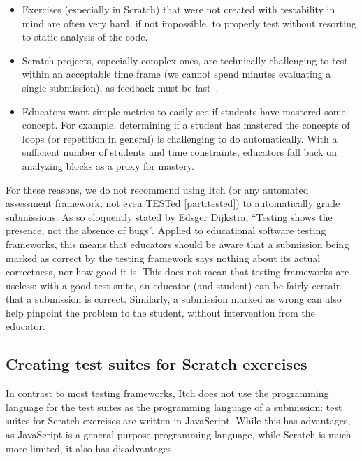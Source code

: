 \documentclass[../main]{subfiles}
\begin{document}
\begin{itemize}
    \item Exercises (especially in Scratch) that were not created with testability in mind are often very hard, if not impossible, to properly test without resorting to static analysis of the code.
    \item Scratch projects, especially complex ones, are technically challenging to test within an acceptable time frame (we cannot spend minutes evaluating a single submission), as feedback must be fast~\autocite{sarsaSpeedingAutomatedAssessment2022}.
    \item Educators want simple metrics to easily see if students have mastered some concept.
          For example, determining if a student has mastered the concepts of loops (or repetition in general) is challenging to do automatically.
          With a sufficient number of students and time constraints, educators fall back on analyzing blocks as a proxy for mastery.
\end{itemize}

For these reasons, we do not recommend using Itch (or any automated assessment framework, not even TESTed \cref{part:tested}) to automatically grade submissions.
As so eloquently stated by Edsger Dijkstra, ``Testing shows the presence, not the absence of bugs''.
Applied to educational software testing frameworks, this means that educators should be aware that a submission being marked as correct by the testing framework says nothing about its actual correctness, nor how good it is.
This does not mean that testing frameworks are useless: with a good test suite, an educator (and student) can be fairly certain that a submission is correct.
Similarly, a submission marked as wrong can also help pinpoint the problem to the student, without intervention from the educator.

\subsection{Creating test suites for Scratch exercises}\label{subsec:creating-test-suites-for-scratch-exercises}

In contrast to most testing frameworks, Itch does not use the programming language for the test suites as the programming language of a submission: test suites for Scratch exercises are written in JavaScript.
While this has advantages, as JavaScript is a general purpose programming language, while Scratch is much more limited, it also has disadvantages.
\end{document}
